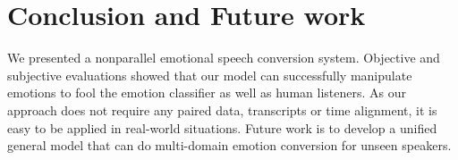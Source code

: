\documentclass{article}
\begin{document}





\section{Conclusion and Future work}
\label{sec:con}
We presented a nonparallel emotional speech conversion system. Objective and subjective evaluations showed that our model can successfully manipulate emotions to fool the emotion classifier as well as human listeners. As our approach does not require any paired data, transcripts or time alignment, it is easy to be applied in real-world situations. Future work is to develop a unified general model that can do multi-domain emotion conversion for unseen speakers.

\end{document}
